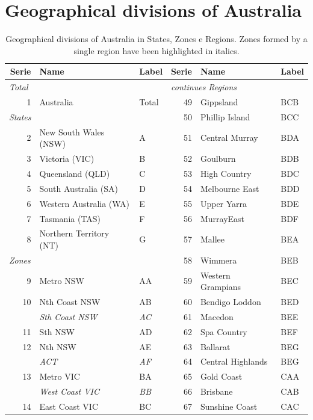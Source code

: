 \documentclass[a4paper,11pt]{article}
\theoremstyle{definition}
\begin{document}
\section{Geographical divisions of Australia}
\label{app:australia}
\begin{table}[H]
	\caption{Geographical divisions of Australia in States, Zones e Regions. Zones formed by a single region have been highlighted in italics.}
	\label{tab:australia}
	\fontsize{9}{10}\selectfont
	\centering
	\begin{tabular}{r l l|r l l} 
		\toprule
		\textbf{Serie} & \textbf{Name}&\textbf{Label} & \textbf{Serie} & \textbf{Name}&\textbf{Label}\\ 
		\midrule
		\multicolumn{1}{l}{\textit{Total}}&&&\multicolumn{3}{l|}{\textit{continues Regions}} \\
		1&Australia&Total& 49& Gippsland &BCB\\
		\cline{1-3}
		\multicolumn{1}{l}{\textit{States}} &&& 50 &Phillip Island& BCC\\
		2 &New South Wales (NSW)& A&51 &Central Murray &BDA\\
		3 &Victoria (VIC) & B&52 &Goulburn& BDB \\
		4 &Queensland (QLD) &C &53 &High Country& BDC\\
		5 &South Australia (SA) &D &54 &Melbourne East& BDD\\
		6 &Western Australia (WA) &E &55& Upper Yarra &BDE\\
		7 &Tasmania (TAS) &F & 56& MurrayEast &BDF\\
		8 &Northern Territory (NT) &G&57 &Mallee& BEA \\
		\cline{1-3}
		\multicolumn{1}{l}{\textit{Zones}} &&&58 &Wimmera& BEB \\
		9 &Metro NSW &AA &59 &Western Grampians &BEC\\
		10 &Nth Coast NSW &AB &60& Bendigo Loddon &BED\\
		& \textit{Sth Coast NSW} & \textit{AC} & 61& Macedon& BEE\\
		11 &Sth NSW &AD &62& Spa Country& BEF\\
		12 &Nth NSW &AE& 63& Ballarat &BEG\\
		&\textit{ACT} &\textit{AF} &64& Central Highlands &BEG\\
		13 &Metro VIC& BA &65& Gold Coast& CAA\\
		&\textit{West Coast VIC}& \textit{BB}& 66 &Brisbane &CAB\\
		14 &East Coast VIC &BC& 67& Sunshine Coast &CAC\\

\end{tabular}
\end{table}
\end{document}

